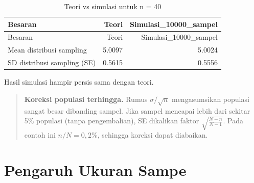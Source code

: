\documentclass[
  indonesian,
  letterpaper,
]{book}
\begin{document}
\begin{longtable}[]{@{}lrr@{}}
\caption{Teori vs simulasi untuk n = 40}\tabularnewline
\toprule\noalign{}
Besaran & Teori & Simulasi\_10000\_sampel \\
\midrule\noalign{}
\endfirsthead
\toprule\noalign{}
Besaran & Teori & Simulasi\_10000\_sampel \\
\midrule\noalign{}
\endhead
\bottomrule\noalign{}
\endlastfoot
Mean distribusi sampling & 5.0097 & 5.0024 \\
SD distribusi sampling (SE) & 0.5615 & 0.5556 \\
\end{longtable}

Hasil simulasi hampir persis sama dengan teori.

\begin{quote}
\textbf{Koreksi populasi terhingga.} Rumus \(\sigma/\sqrt{n}\)
mengasumsikan populasi sangat besar dibanding sampel. Jika sampel
mencapai lebih dari sekitar 5\% populasi (tanpa pengembalian), SE
dikalikan faktor \(\sqrt{\frac{N-n}{N-1}}\). Pada contoh ini
\(n/N = 0{,}2\%\), sehingga koreksi dapat diabaikan.
\end{quote}

\section{Pengaruh Ukuran Sampe}\label{pengaruh-ukuran-sampe}
\end{document}
